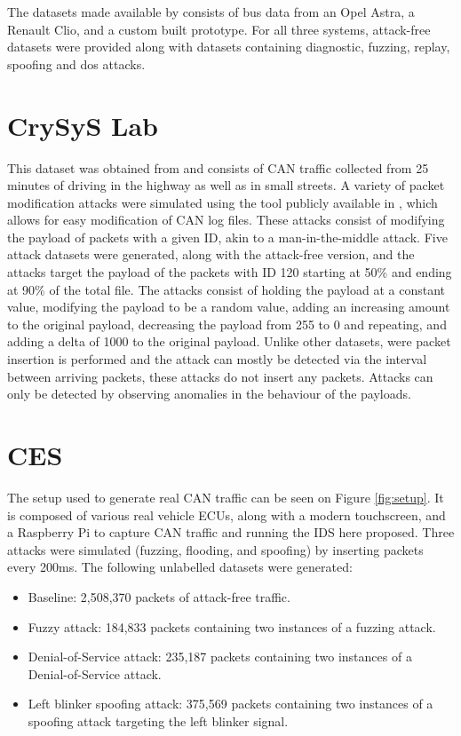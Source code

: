 The datasets made available by \cite{Dupont2019} consists of bus data from an Opel Astra, a Renault Clio, and a custom built prototype. For all three systems, attack-free datasets were provided along with datasets containing diagnostic, fuzzing, replay, spoofing and \gls{dos} attacks.

\section{CrySyS Lab}
\label{sec:dataset_crysys}

This dataset was obtained from \cite{crysys} and consists of CAN traffic collected from 25 minutes of driving in the highway as well as in small streets. A variety of packet modification attacks were simulated using the tool publicly available in \cite{infector}, which allows for easy modification of CAN log files. These attacks consist of modifying the payload of packets with a given ID, akin to a man-in-the-middle attack. Five attack datasets were generated, along with the attack-free version, and the attacks target the payload of the packets with ID 120 starting at 50\% and ending at 90\% of the total file. The attacks consist of holding the payload at a constant value, modifying the payload to be a random value, adding an increasing amount to the original payload, decreasing the payload from 255 to 0 and repeating, and adding a delta of 1000 to the original payload. Unlike other datasets, were packet insertion is performed and the attack can mostly be detected via the interval between arriving packets, these attacks do not insert any packets. Attacks can only be detected by observing anomalies in the behaviour of the payloads.

\section{CES}

The setup used to generate real CAN traffic can be seen on Figure \ref{fig:setup}. It is composed of various real vehicle ECUs, along with a modern touchscreen, and a Raspberry Pi to capture CAN traffic and running the IDS here proposed. Three attacks were simulated (fuzzing, flooding, and spoofing) by inserting packets every 200ms. The following unlabelled datasets were generated:

\begin{itemize}
    \item Baseline: 2,508,370 packets of attack-free traffic.
    \item Fuzzy attack: 184,833 packets containing two instances of a fuzzing attack.
    \item Denial-of-Service attack: 235,187 packets containing two instances of a Denial-of-Service attack.
    \item Left blinker spoofing attack: 375,569 packets containing two instances of a spoofing attack targeting the left blinker signal.
\end{itemize}

